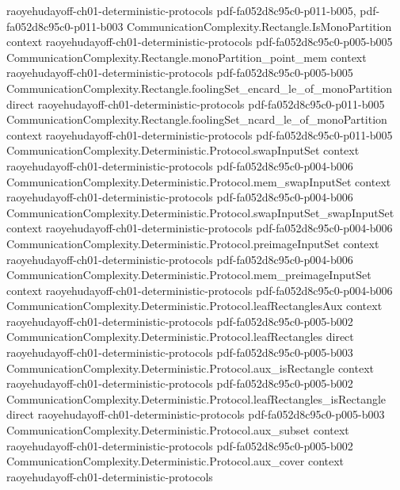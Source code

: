 \begin{theorem}
  {raoyehudayoff-ch01-deterministic-protocols}
  {pdf-fa052d8c95c0-p011-b005,
    pdf-fa052d8c95c0-p011-b003}
\proofstep
  {CommunicationComplexity.Rectangle.IsMonoPartition}
  {context}
  {raoyehudayoff-ch01-deterministic-protocols}
  {pdf-fa052d8c95c0-p005-b005}
\proofstep
  {CommunicationComplexity.Rectangle.monoPartition_point_mem}
  {context}
  {raoyehudayoff-ch01-deterministic-protocols}
  {pdf-fa052d8c95c0-p005-b005}
\proofstep
  {CommunicationComplexity.Rectangle.foolingSet_encard_le_of_monoPartition}
  {direct}
  {raoyehudayoff-ch01-deterministic-protocols}
  {pdf-fa052d8c95c0-p011-b005}
\proofstep
  {CommunicationComplexity.Rectangle.foolingSet_ncard_le_of_monoPartition}
  {context}
  {raoyehudayoff-ch01-deterministic-protocols}
  {pdf-fa052d8c95c0-p011-b005}
\proofstep
  {CommunicationComplexity.Deterministic.Protocol.swapInputSet}
  {context}
  {raoyehudayoff-ch01-deterministic-protocols}
  {pdf-fa052d8c95c0-p004-b006}
\proofstep
  {CommunicationComplexity.Deterministic.Protocol.mem_swapInputSet}
  {context}
  {raoyehudayoff-ch01-deterministic-protocols}
  {pdf-fa052d8c95c0-p004-b006}
\proofstep
  {CommunicationComplexity.Deterministic.Protocol.swapInputSet_swapInputSet}
  {context}
  {raoyehudayoff-ch01-deterministic-protocols}
  {pdf-fa052d8c95c0-p004-b006}
\proofstep
  {CommunicationComplexity.Deterministic.Protocol.preimageInputSet}
  {context}
  {raoyehudayoff-ch01-deterministic-protocols}
  {pdf-fa052d8c95c0-p004-b006}
\proofstep
  {CommunicationComplexity.Deterministic.Protocol.mem_preimageInputSet}
  {context}
  {raoyehudayoff-ch01-deterministic-protocols}
  {pdf-fa052d8c95c0-p004-b006}
\proofstep
  {CommunicationComplexity.Deterministic.Protocol.leafRectanglesAux}
  {context}
  {raoyehudayoff-ch01-deterministic-protocols}
  {pdf-fa052d8c95c0-p005-b002}
\proofstep
  {CommunicationComplexity.Deterministic.Protocol.leafRectangles}
  {direct}
  {raoyehudayoff-ch01-deterministic-protocols}
  {pdf-fa052d8c95c0-p005-b003}
\proofstep
  {CommunicationComplexity.Deterministic.Protocol.aux_isRectangle}
  {context}
  {raoyehudayoff-ch01-deterministic-protocols}
  {pdf-fa052d8c95c0-p005-b002}
\proofstep
  {CommunicationComplexity.Deterministic.Protocol.leafRectangles_isRectangle}
  {direct}
  {raoyehudayoff-ch01-deterministic-protocols}
  {pdf-fa052d8c95c0-p005-b003}
\proofstep
  {CommunicationComplexity.Deterministic.Protocol.aux_subset}
  {context}
  {raoyehudayoff-ch01-deterministic-protocols}
  {pdf-fa052d8c95c0-p005-b002}
\proofstep
  {CommunicationComplexity.Deterministic.Protocol.aux_cover}
  {context}
  {raoyehudayoff-ch01-deterministic-protocols}

\end{theorem}

